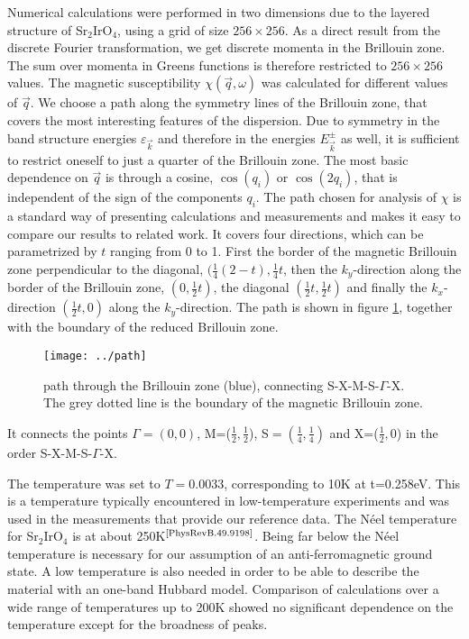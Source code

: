 \documentclass[a4paper,12pt]{report}
\begin{document}
Numerical calculations were performed in two dimensions due to the layered structure of Sr$_2$IrO$_4$, 
using a grid of size $256\times256$.
As a direct result from the discrete Fourier transformation, we get discrete momenta in the Brillouin zone.
The sum over momenta in Greens functions is therefore restricted to $256\times256$ values.
The magnetic susceptibility $\chi(\vec q,\omega)$ was calculated for different values of $\vec q$.
We choose a path along the symmetry lines of the Brillouin zone, that covers the most interesting features of the dispersion.
Due to symmetry in the band structure energies $\varepsilon_{\vec k}$ and therefore in the energies $E^{\pm}_{\vec k}$ as well,
it is sufficient to restrict oneself to just a quarter of the Brillouin zone.
The most basic dependence on $\vec q$ is through a cosine, $\cos (q_i)$ or $\cos(2q_i)$, that is independent of the sign of the components $q_i$.
%
The path chosen for analysis of $\chi$ is a standard way of presenting calculations and measurements and makes it easy to compare our results to related work.
It covers four directions, which can be parametrized by $t$ ranging from 0 to 1.
First the border of the magnetic Brillouin zone perpendicular to the diagonal, $(\frac14(2-t),\frac14t$, 
then the $k_y$-direction along the border of the Brillouin zone, $(0,\frac12t)$,
the diagonal $(\frac12t,\frac12t)$
and finally 
the $k_x$-direction $(\frac12t,0)$ along the $k_y$-direction.
The path is shown in figure \ref{path}, together with the boundary of the reduced Brillouin zone.
\begin{figure}
 \begin{center}
  \texttt{[image: ../path]}
  \caption{path through the Brillouin zone (blue), connecting S-X-M-S-$\Gamma$-X. The grey dotted line is the boundary of the magnetic Brillouin zone.}
 \label{path}
 \end{center}
\end{figure}
It connects the points $\Gamma=(0,0)$, M=($\frac12,\frac12$), S$=(\frac14,\frac14)$ and X=($\frac12,0$) in the order S-X-M-S-$\Gamma$-X.

The temperature was set to $T=0.0033$, corresponding to 10K at t=0.258eV.
This is a temperature  typically encountered in low-temperature experiments and was used in the measurements that provide our reference data. 
The Néel temperature for Sr$_2$IrO$_4$ is at about 250K$^{\text{\cite{PhysRevB.49.9198}}}$.
Being far below the Néel temperature is necessary for our assumption of an anti-ferromagnetic ground state.
A low temperature is also needed in order to be able to describe the material with an one-band Hubbard model. 
Comparison of calculations over a wide range of temperatures up to 200K showed no significant dependence on the temperature except for the broadness of peaks.
\end{document}
